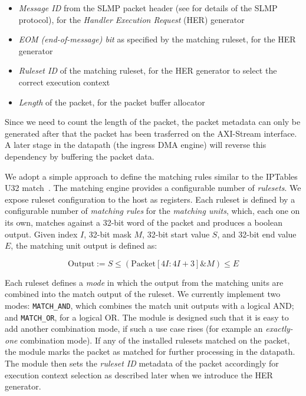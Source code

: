\begin{itemize}
    \item \emph{Message ID} from the SLMP packet header (see  for details of the SLMP protocol), for the \emph{Handler Execution Request} (HER) generator
    \item \emph{EOM (end-of-message) bit} as specified by the matching ruleset, for the HER generator
    \item \emph{Ruleset ID} of the matching ruleset, for the HER generator to select the correct execution context
    \item \emph{Length} of the packet, for the packet buffer allocator
\end{itemize}

Since we need to count the length of the packet, the packet metadata can only be generated after that the packet has been trasferred on the AXI-Stream interface.  A later stage in the datapath (the ingress DMA engine) will reverse this dependency by buffering the packet data.

We adopt a simple approach to define the matching rules similar to the IPTables U32 match~\cite{cohen_iptables_nodate}.  The matching engine provides a configurable number of \emph{rulesets}.  We expose ruleset configuration to the host as registers.  Each ruleset is defined by a configurable number of \emph{matching rules} for the \emph{matching units}, which, each one on its own, matches against a 32-bit word of the packet and produces a boolean output.  Given index $I$, 32-bit mask $M$, 32-bit start value $S$, and 32-bit end value $E$, the matching unit output is defined as:

\[
\text{Output} := S \le (\text{Packet}[4I:4I+3] \mathbin{\&} M) \le E
\]

Each ruleset defines a \emph{mode} in which the output from the matching units are combined into the match output of the ruleset.  We currently implement two modes: \texttt{MATCH\_\-AND}, which combines the match unit outputs with a logical AND; and \texttt{MATCH\_\-OR}, for a logical OR.  The module is designed such that it is easy to add another combination mode, if such a use case rises (for example an \emph{exactly-one} combination mode).  If any of the installed rulesets matched on the packet, the module marks the packet as matched for further processing in the datapath.  The module then sets the \emph{ruleset ID} metadata of the packet accordingly for execution context selection as described later when we introduce the HER generator.

